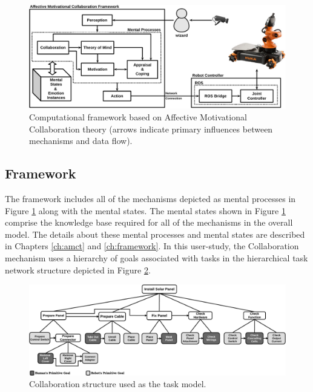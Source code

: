 \documentclass[12pt]{report}
\begin{document}
\begin{figure}[tbh]
  \centering
  \includegraphics[width=\textwidth]{figure/framework-croped.pdf}
  \caption{\fontsize{10}{10}\selectfont Computational framework based on
  Affective Motivational Collaboration theory (arrows indicate primary
  influences between mechanisms and data flow).}
  \label{fig:framework}
\end{figure}

\subsection{Framework}
\label{sec:theory}
The framework includes all of the mechanisms depicted as mental processes in
Figure \ref{fig:framework} along with the mental states. The mental
states shown in Figure \ref{fig:framework} comprise the knowledge base required
for all of the mechanisms in the overall model. The details about these mental
processes and mental states are described in Chapters \ref{ch:amct} and
\ref{ch:framework}. In this user-study, the Collaboration mechanism uses a
hierarchy of goals associated with tasks in the hierarchical task network
structure depicted in Figure \ref{fig:collaboration_structure}.

\begin{figure}[tbh]
  \centering
  \includegraphics[width=1\textwidth]{figure/collaborationStructure.pdf}
  \caption{{\fontsize{10}{10}\selectfont Collaboration structure used as the
  task model.}}
  \label{fig:collaboration_structure}
\end{figure}
\end{document}
